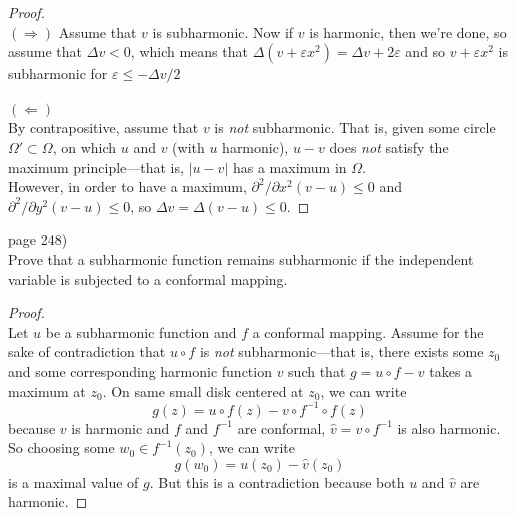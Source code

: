 \documentclass{article}
\newenvironment{problem}[2][Problem]{\begin{trivlist}
\item[\hskip \labelsep {\bfseries #1}\hskip \labelsep {\bfseries #2.}]}{\end{trivlist}}
\begin{document}
\begin{proof} \text{} \\
  $\mathbf{(\Longrightarrow)}$
    Assume that $v$ is subharmonic. Now if $v$ is harmonic, then we're done, so
    assume that $\Delta v < 0$, which means that
    $\Delta (v + \varepsilon x^2) = \Delta v + 2\varepsilon$ and so
    $v + \varepsilon x^2$ is subharmonic for $\varepsilon \leq -\Delta v/2$
  \\~\\
  $\mathbf{(\Longleftarrow)}$\\
    By contrapositive, assume that $v$ is \textit{not}
    subharmonic. That is, given some circle $\Omega' \subset \Omega$, on which
    $u$ and $v$ (with $u$ harmonic), $u - v$ does \textit{not} satisfy the maximum
    principle---that is, $|u - v|$ has a maximum in $\Omega$. \\
    However, in order to have a maximum,
    $\partial ^ { 2} / \partial x ^ { 2} ( v - u ) \leq 0$ and
    $\partial ^ { 2} / \partial y ^ { 2} ( v - u ) \leq 0$, so
    $\Delta v = \Delta ( v - u ) \leq 0$.
\end{proof}
\pagebreak

\begin{problem}{4} (page 248) \\
  Prove that a subharmonic function remains subharmonic if the independent
  variable is subjected to a conformal mapping.
\end{problem}

\begin{proof} \text{} \\
  Let $u$ be a subharmonic function and $f$ a conformal mapping. Assume for the
  sake of contradiction that $u \circ f$ is \textit{not} subharmonic---that is,
  there exists some $z_0$ and some corresponding harmonic function $v$ such that
  $g = u \circ f - v$ takes a maximum at $z_0$.
  On same small disk centered at $z_0$, we can write \[
    g(z) = u \circ f(z) - v \circ f^{-1} \circ f(z)
  \] because $v$ is harmonic and $f$ and $f^{-1}$ are conformal,
  $\hat{v} = v \circ f^{-1}$ is also harmonic.
  So choosing some $w_0 \in f^{-1}(z_0)$, we can write \[
    g(w_0) = u(z_0) - \hat{v}(z_0)
  \] is a maximal value of $g$.
  But this is a contradiction because both $u$ and $\hat{v}$ are harmonic.

\end{proof}
\pagebreak
\end{document}

